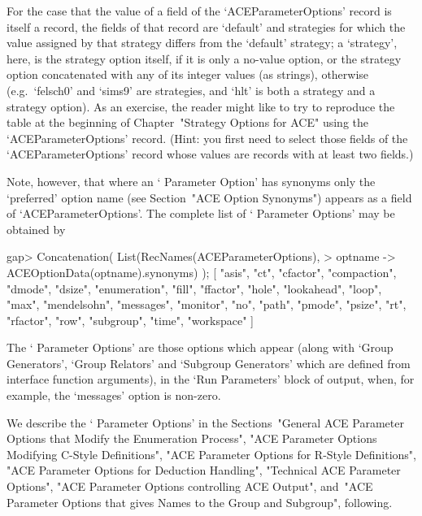 For the case that the value of a field  of  the  `ACEParameterOptions'
record is itself a record, the fields of that record are `default' and
strategies for which the value assigned by that strategy differs  from
the `default' strategy; a \lq{}strategy', here, is the strategy option
itself, if it is only  a  no-value  option,  or  the  strategy  option
concatenated with any of its integer values  (as  strings),  otherwise
(e.g.~`felsch0' and `sims9'  are  strategies,  and  `hlt'  is  both  a
strategy and a strategy option). As an exercise, the reader might like
to try to reproduce the table at the  beginning  of  Chapter~"Strategy
Options for ACE" using the `ACEParameterOptions'  record.  (Hint:  you
first need to select those fields of the `ACEParameterOptions'  record
whose values are records with at least two fields.)

Note,  however,  that  where  an  \lq{}{\ACE}  Parameter  Option'  has
synonyms only the \lq{}preferred' option name (see Section~"ACE Option
Synonyms") appears as a field of `ACEParameterOptions'.  The  complete
list of \lq{}{\ACE} Parameter Options' may be obtained by

\beginexample
gap> Concatenation( List(RecNames(ACEParameterOptions),                    
>                        optname -> ACEOptionData(optname).synonyms) ); 
[ "asis", "ct", "cfactor", "compaction", "dmode", "dsize", "enumeration", 
  "fill", "ffactor", "hole", "lookahead", "loop", "max", "mendelsohn", 
  "messages", "monitor", "no", "path", "pmode", "psize", "rt", "rfactor", 
  "row", "subgroup", "time", "workspace" ]
\endexample

The \lq{}{\ACE} Parameter Options'  are  those  options  which  appear
(along  with  `Group  Generators',  `Group  Relators'  and   `Subgroup
Generators'  which  are  defined  from   {\ACE}   interface   function
arguments), in the \lq{}Run Parameters' block of {\ACE} output,  when,
for example, the `messages' option is non-zero.

We   describe   the   \lq{}{\ACE}   Parameter    Options'    in    the
Sections~"General ACE Parameter Options that  Modify  the  Enumeration
Process", "ACE Parameter Options Modifying C-Style Definitions",  "ACE
Parameter Options for R-Style Definitions", "ACE Parameter Options for
Deduction Handling", "Technical ACE Parameter Options", "ACE Parameter
Options controlling ACE Output", and~"ACE Parameter Options that gives
Names to the Group and Subgroup", following.



